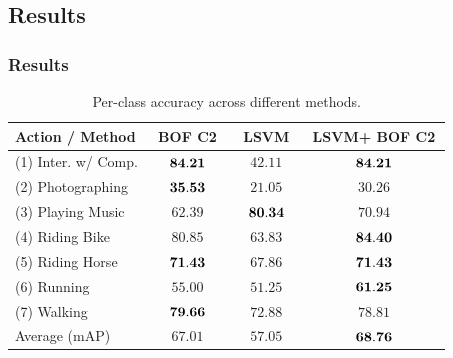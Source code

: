 \documentclass{beamer}
\begin{document}
\subsection{Results}
\begin{frame}
\frametitle{Results}

\begin{table}[tbp]
\centering
\begin{tabular}{|l||c|c|c|}
\hline
 Action /  Method & $~~$BOF C2$~~$ & $~~$LSVM$~~$ & $~$LSVM+ BOF C2$~$ \\ \hline 
(1) Inter. w/ Comp. & ${\bf 84.21}$ & $42.11$ & ${\bf 84.21}$\\ \hline 
(2) Photographing   & ${\bf 35.53}$ & $21.05$ & $30.26$\\ \hline 
(3) Playing Music   & $62.39$ & ${\bf 80.34}$ & $70.94$\\ \hline 
(4) Riding Bike     & $80.85$ & $63.83$ & ${\bf 84.40}$\\ \hline 
(5) Riding Horse    & ${\bf 71.43}$ & $67.86$ & ${\bf 71.43}$\\ \hline 
(6) Running         & $55.00$ & $51.25$ & ${\bf 61.25}$\\ \hline 
(7) Walking         & ${\bf 79.66}$ & $72.88$ & $78.81$\\ \hline  \hline
 Average (mAP)      & $67.01$ & $57.05$ & ${\bf 68.76}$\\ \hline 
\end{tabular}
\caption{Per-class accuracy across different methods.}
\label{tab:per_class}
\end{table}

\end{frame}

\end{document}
